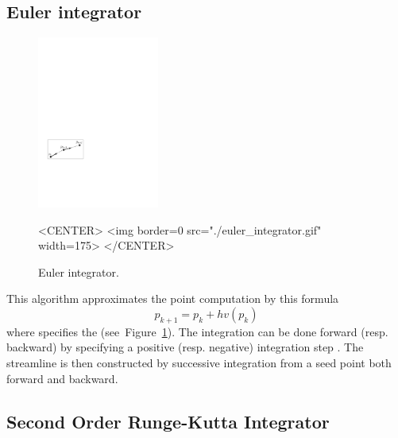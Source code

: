 \subsection{Euler integrator}

\begin{figure}[h!]
\begin{ccTexOnly}
\begin{center}
\includegraphics[width=4cm]{Stream_lines_2/euler_integrator}
\end{center}
\end{ccTexOnly}
\begin{ccHtmlOnly}
<CENTER>
<img border=0 src="./euler_integrator.gif" width=175>
</CENTER>
\end{ccHtmlOnly}
\begin{center}
\caption{Euler integrator.
\label{euler_fig}}
\end{center}
\end{figure}

This algorithm approximates the point computation by this formula
$$p_{k+1} = p_k + hv(p_k)$$ where  specifies the
 (see~Figure~\ref{euler_fig}). The integration
can be done forward (resp. backward) by specifying a positive
(resp. negative) integration step . The streamline is then
constructed by successive integration from a seed point both forward
and backward.

\subsection{Second Order Runge-Kutta Integrator}

